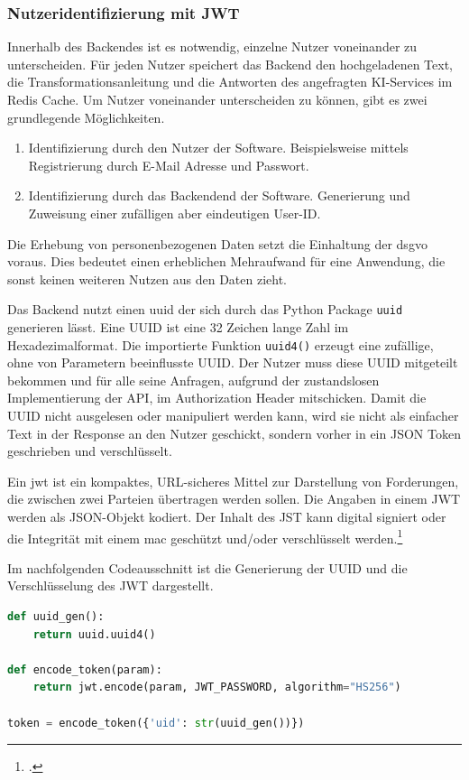 \subsubsection{Nutzeridentifizierung mit JWT}
Innerhalb des Backendes ist es notwendig, einzelne Nutzer voneinander zu unterscheiden. Für jeden Nutzer speichert das Backend den hochgeladenen Text, die Transformationsanleitung und die Antworten des angefragten KI-Services im Redis Cache. Um Nutzer voneinander unterscheiden zu können, gibt es zwei grundlegende Möglichkeiten. 
\begin{enumerate}
\item Identifizierung durch den Nutzer der Software. Beispielsweise mittels Registrierung durch E-Mail Adresse und Passwort.
\item Identifizierung durch das Backendend der Software. Generierung und Zuweisung einer zufälligen aber eindeutigen User-ID.
\end{enumerate}

Die Erhebung von personenbezogenen Daten setzt die Einhaltung der \ac{dsgvo} voraus. Dies bedeutet einen erheblichen Mehraufwand für eine Anwendung, die sonst keinen weiteren Nutzen aus den Daten zieht.

Das Backend nutzt einen \ac{uuid} der sich durch das Python Package \texttt{uuid} generieren lässt. Eine UUID ist eine 32 Zeichen lange Zahl im Hexadezimalformat. Die importierte Funktion \texttt{uuid4()} erzeugt eine zufällige, ohne von Parametern beeinflusste UUID. Der Nutzer muss diese UUID mitgeteilt bekommen und für alle seine Anfragen, aufgrund der zustandslosen Implementierung der API, im Authorization Header mitschicken. Damit die UUID nicht ausgelesen oder manipuliert werden kann, wird sie nicht als einfacher Text in der Response an den Nutzer geschickt, sondern vorher in ein JSON Token geschrieben und verschlüsselt.

Ein \ac{jwt} ist ein kompaktes, URL-sicheres Mittel zur Darstellung von Forderungen, die zwischen zwei Parteien übertragen werden sollen. Die Angaben in einem JWT werden als JSON-Objekt kodiert. Der Inhalt des JST kann digital signiert oder die Integrität mit einem \ac{mac} geschützt und/oder verschlüsselt werden.\footcite{jones2015json}

Im nachfolgenden Codeausschnitt ist die Generierung der UUID und die Verschlüsselung des JWT dargestellt.
\begin{lstlisting}[language=Python]
def uuid_gen():
    return uuid.uuid4()
    
def encode_token(param):
    return jwt.encode(param, JWT_PASSWORD, algorithm="HS256")

token = encode_token({'uid': str(uuid_gen())})
\end{lstlisting}

